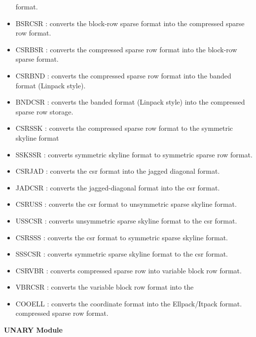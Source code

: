 \documentclass[12pt]{article}
\begin{document}
\begin{itemize}
           format.                                                    
\item BSRCSR  : converts the block-row sparse format into the compressed       
           sparse row format.                                         
\item CSRBSR  : converts the compressed sparse row format into the block-row   
           sparse format.                                             
\item CSRBND  : converts the compressed sparse row format into the  banded   
           format (Linpack style).                                    
\item BNDCSR  : converts the banded format (Linpack style) into the compressed 
           sparse row storage.                                        
\item CSRSSK  : converts the compressed sparse row format to the symmetric
           skyline format                                           
\item SSKSSR  : converts symmetric skyline format to symmetric
sparse row           format.                             
\item CSRJAD  : converts the csr format into the jagged diagonal format.
\item JADCSR  : converts the jagged-diagonal format into the csr format.
\item CSRUSS  : converts the csr format to unsymmetric sparse skyline format.
\item USSCSR  : converts unsymmetric sparse skyline format to the csr format.
\item CSRSSS  : converts the csr format to symmetric sparse skyline format.
\item SSSCSR  : converts symmetric sparse skyline format to the csr format.
\item CSRVBR  : converts compressed sparse row into variable block row format.
\item VBRCSR  : converts the variable block row format into the
\item COOELL  : converts the coordinate format into the Ellpack/Itpack format.
compressed sparse row format.
\end{itemize}

\vskip 0.3in
\centerline{\bf UNARY Module}
\end{document}
